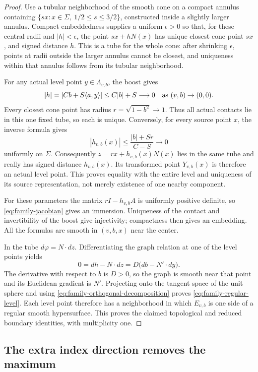 \begin{proof}
Use a tubular neighborhood of the smooth cone on a compact annulus
containing $\{sx:x\in\Sigma,\ 1/2\le s\le3/2\}$, constructed inside
a slightly larger annulus.  Compact embeddedness supplies a uniform
$\epsilon>0$ so that, for these central radii and $|h|<\epsilon$,
the point $sx+hN(x)$ has unique closest cone point $sx$, and signed
distance $h$.  This is a tube for the whole cone: after shrinking
$\epsilon$, points at radii outside the larger annulus cannot be
closest, and uniqueness within that annulus follows from its tubular
neighborhood.

For any actual level point $y\in\Lambda_{v,b}$, the boost gives
\[
 |h|=|Cb+S\langle a,y\rangle|\le C|b|+S\longrightarrow0
 \quad\hbox{as }(v,b)\to(0,0).
\]
Every closest cone point has radius $r=\sqrt{1-b^2}\to1$.
Thus all actual contacts lie in this one fixed tube, so each is
unique.  Conversely, for every source point $x$, the inverse formula
gives
\[
 |h_{v,b}(x)|\le\frac{|b|+Sr}{C-S}\longrightarrow0
\]
uniformly on $\Sigma$.
Consequently $z=rx+h_{v,b}(x)N(x)$ lies in the same tube and really
has signed distance $h_{v,b}(x)$.  Its transformed point
$Y_{v,b}(x)$ is therefore an actual level point.
This proves equality with the entire level and uniqueness of its
source representation, not merely existence of one nearby component.

For these parameters the matrix $rI-h_{v,b}A$ is uniformly positive
definite, so \eqref{eq:family-jacobian} gives an immersion.
Uniqueness of the contact and invertibility of the boost give
injectivity; compactness then gives an embedding.
All the formulas are smooth in $(v,b,x)$ near the center.

In the tube $d\varphi=N\cdot dz$.  Differentiating the graph relation
at one of the level points yields
\[
 0=dh-N\cdot dz
  =D\bigl(db-N'\cdot dy\bigr).
\]
The derivative with respect to $b$ is $D>0$, so the graph is smooth
near that point and its Euclidean gradient is $N'$.
Projecting onto the tangent space of the unit sphere and using
\eqref{eq:family-orthogonal-decomposition} proves
\eqref{eq:family-regular-level}.
Each level point therefore has a neighborhood in which $E_{v,b}$ is
one side of a regular smooth hypersurface.  This proves the claimed
topological and reduced boundary identities, with multiplicity one.
\end{proof}

\subsection{The extra index direction removes the maximum}

